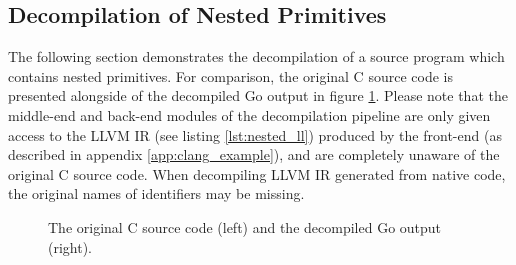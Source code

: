 
\subsection{Decompilation of Nested Primitives}
\label{app:decompilation_of_nested_primitives}

The following section demonstrates the decompilation of a source program which contains nested primitives. For comparison, the original C source code is presented alongside of the decompiled Go output in figure \ref{fig:nested_comparison}. Please note that the middle-end and back-end modules of the decompilation pipeline are only given access to the LLVM IR (see listing \ref{lst:nested_ll}) produced by the front-end (as described in appendix \ref{app:clang_example}), and are completely unaware of the original C source code. When decompiling LLVM IR generated from native code, the original names of identifiers may be missing.

\begin{figure}[htbp]
	\centering
	\begin{subfigure}[t]{0.49\textwidth}
		
	\end{subfigure}
	\qquad
	\begin{subfigure}[t]{0.45\textwidth}
		
	\end{subfigure}
	\caption{The original C source code (left) and the decompiled Go output (right).}
	\label{fig:nested_comparison}
\end{figure}


